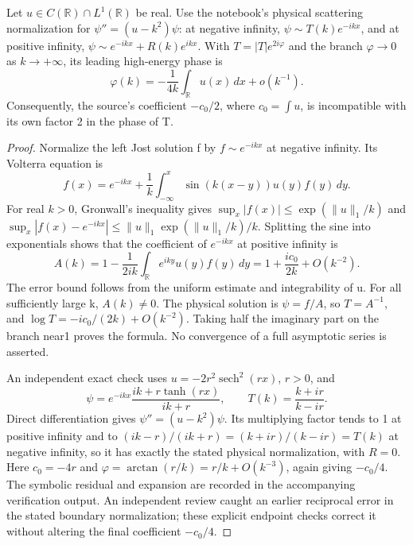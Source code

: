 \begin{proposition}\oursComputed
Let \(u\in C(\mathbb R)\cap L^1(\mathbb R)\) be real. Use the
notebook's physical scattering normalization for
\(\psi''=(u-k^2)\psi\): at negative infinity,
\(\psi\sim T(k)e^{-ikx}\), and at positive infinity,
\(\psi\sim e^{-ikx}+R(k)e^{ikx}\). With
\(T=|T|e^{2i\varphi}\) and the branch \(\varphi\to 0\) as
\(k\to+\infty\), its leading high-energy phase is
\[
 \varphi(k)=-\frac{1}{4k}\int_{\mathbb R}u(x)\,dx+o(k^{-1}).
\]
Consequently, the source's coefficient \(-c_0/2\), where
\(c_0=\int u\), is incompatible with its own factor 2 in the phase of T.
\end{proposition}
\begin{proof}
Normalize the left Jost solution f by \(f\sim e^{-ikx}\) at negative
infinity. Its Volterra equation is
\[
 f(x)=e^{-ikx}+\frac1k\int_{-\infty}^x
          \sin(k(x-y))u(y)f(y)\,dy.
\]
For real \(k>0\), Gronwall's inequality gives
\(\sup_x|f(x)|\le\exp(\|u\|_1/k)\) and
\(\sup_x|f(x)-e^{-ikx}|\le
\|u\|_1\exp(\|u\|_1/k)/k\).
Splitting the sine into exponentials shows that the coefficient of
\(e^{-ikx}\) at positive infinity is
\[
 A(k)=1-\frac1{2ik}\int_{\mathbb R}e^{iky}u(y)f(y)\,dy
     =1+\frac{i c_0}{2k}+O(k^{-2}).
\]
The error bound follows from the uniform estimate and integrability
of u. For all sufficiently large k, \(A(k)\ne0\).
The physical solution is \(\psi=f/A\), so \(T=A^{-1}\), and
\(\log T=-i c_0/(2k)+O(k^{-2})\). Taking half the imaginary part
on the branch near1 proves the formula. No convergence of a full
asymptotic series is asserted.

An independent exact check uses
\(u=-2r^2\operatorname{sech}^2(rx)\), \(r>0\), and
\[
 \psi=e^{-ikx}\frac{ik+r\tanh(rx)}{ik+r},\qquad
 T(k)=\frac{k+ir}{k-ir}.
\]
Direct differentiation gives \(\psi''=(u-k^2)\psi\). Its multiplying
factor tends to 1 at positive infinity and to
\((ik-r)/(ik+r)=(k+ir)/(k-ir)=T(k)\) at negative infinity,
so it has exactly the stated physical normalization, with \(R=0\).
Here \(c_0=-4r\) and \(\varphi=\arctan(r/k)=r/k+O(k^{-3})\),
again giving \(-c_0/4\). The symbolic residual and expansion are
recorded in the accompanying verification output. An independent
review caught an earlier reciprocal error in the stated boundary
normalization; these explicit endpoint checks correct it without
altering the final coefficient \(-c_0/4\).
\end{proof}

